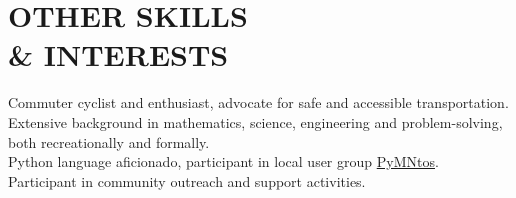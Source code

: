 
\section{OTHER SKILLS \\ \& INTERESTS}
    Commuter cyclist and enthusiast, advocate for safe and accessible
    transportation.
    \vspace{2 mm} \\
    Extensive background in mathematics, science, engineering and
    problem-solving, both recreationally and formally.
    \vspace{2 mm} \\
    Python language aficionado, participant in local user group
    \href{http://www.python.mn/}{PyMNtos}. 
    \vspace{2 mm} \\
    Participant in community outreach and support activities.


